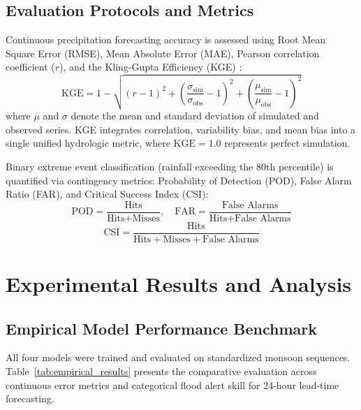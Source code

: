 \documentclass[journal]{IEEEtran}
\begin{document}
\subsection{Evaluation Protocols and Metrics}
Continuous precipitation forecasting accuracy is assessed using Root Mean Square Error (RMSE), Mean Absolute Error (MAE), Pearson correlation coefficient ($r$), and the Kling-Gupta Efficiency (KGE) \cite{gupta2009decomposition}:
\begin{equation}
\text{KGE} = 1 - \sqrt{(r - 1)^2 + \left(\frac{\sigma_{\text{sim}}}{\sigma_{\text{obs}}} - 1\right)^2 + \left(\frac{\mu_{\text{sim}}}{\mu_{\text{obs}}} - 1\right)^2}
\label{eq:kge}
\end{equation}
where $\mu$ and $\sigma$ denote the mean and standard deviation of simulated and observed series. KGE integrates correlation, variability bias, and mean bias into a single unified hydrologic metric, where $\text{KGE} = 1.0$ represents perfect simulation.

Binary extreme event classification (rainfall exceeding the 80th percentile) is quantified via contingency metrics: Probability of Detection (POD), False Alarm Ratio (FAR), and Critical Success Index (CSI):
\begin{equation}
\text{POD} = \frac{\text{Hits}}{\text{Hits} + \text{Misses}}, \quad \text{FAR} = \frac{\text{False Alarms}}{\text{Hits} + \text{False Alarms}}
\end{equation}
\begin{equation}
\text{CSI} = \frac{\text{Hits}}{\text{Hits} + \text{Misses} + \text{False Alarms}}
\end{equation}

\section{Experimental Results and Analysis}

\subsection{Empirical Model Performance Benchmark}
All four models were trained and evaluated on standardized monsoon sequences. Table~\ref{tab:empirical_results} presents the comparative evaluation across continuous error metrics and categorical flood alert skill for 24-hour lead-time forecasting.
\end{document}
